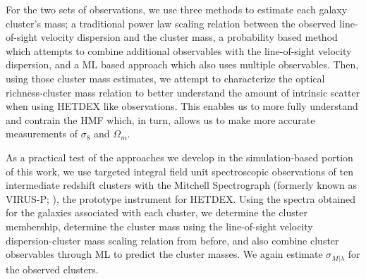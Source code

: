 For the two sets of observations, we use three methods to estimate each galaxy cluster's mass; a traditional power law scaling relation between the observed line-of-sight velocity dispersion and the cluster mass, a probability based method which attempts to combine additional observables with the line-of-sight velocity dispersion, and a ML based approach which also uses multiple observables. Then, using those cluster mass estimates, we attempt to characterize the optical richness-cluster mass relation to better understand the amount of intrinsic scatter when using HETDEX like observations. This enables us to more fully understand and contrain the HMF which, in turn, allows us to make more accurate measurements of $\sigma_8$ and $\Omega_m$.

As a practical test of the approaches we develop in the simulation-based portion of this work, we use targeted integral field unit spectroscopic observations of ten intermediate redshift clusters with the Mitchell Spectrograph (formerly known as VIRUS-P; \citealt{Hill2008a}), the prototype instrument for HETDEX. Using the spectra obtained for the galaxies associated with each cluster, we determine the cluster membership, determine the cluster mass using the line-of-sight velocity dispersion-cluster mass scaling relation from before, and also combine cluster observables through ML to predict the cluster masses. We again estimate $\sigma_{M|\lambda}$ for the observed clusters.
